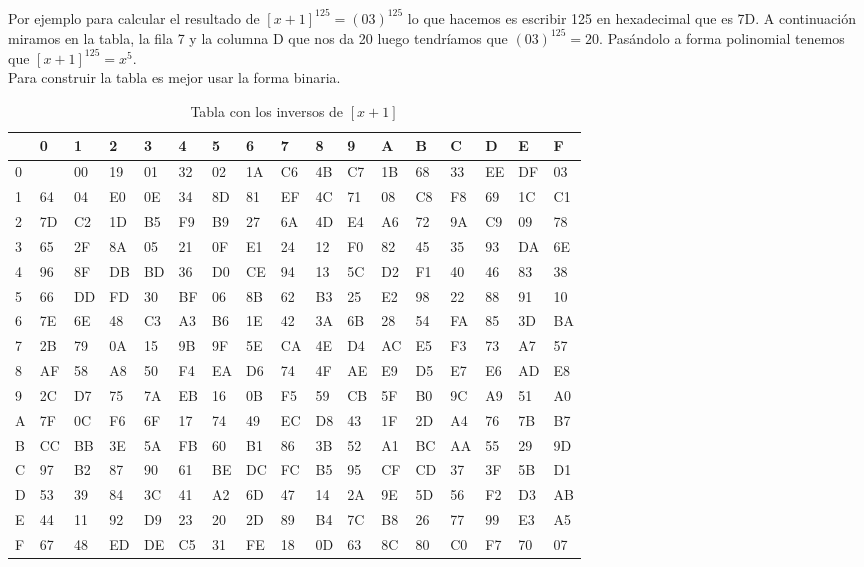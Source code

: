 Por ejemplo para calcular el resultado de $[x+1]^{125}=(03)^{125}$ lo que hacemos es escribir 125 en hexadecimal que es 7D. A continuación miramos en la tabla, la fila 7 y la columna D que nos da 20 luego tendríamos que $(03)^{125}=20$. Pasándolo a forma polinomial tenemos que $[x+1]^{125}=x^5$.\\
Para construir la tabla es mejor usar la forma binaria.

\begin{table}[!htb]
    \begin{adjustwidth}{-.8in}{-.8in}  
\begin{tabular}{|l|l|l|l|l|l|l|l|l|l|l|l|l|l|l|l|l|}
\hline
  & 0  & 1  & 2  & 3  & 4  & 5  & 6  & 7  & 8  & 9  & A  & B  & C  & D  & E  & F  \\ \hline
0 &    & 00 & 19 & 01 & 32 & 02 & 1A & C6 & 4B & C7 & 1B & 68 & 33 & EE & DF & 03 \\ \hline
1 & 64 & 04 & E0 & 0E & 34 & 8D & 81 & EF & 4C & 71 & 08 & C8 & F8 & 69 & 1C & C1 \\ \hline
2 & 7D & C2 & 1D & B5 & F9 & B9 & 27 & 6A & 4D & E4 & A6 & 72 & 9A & C9 & 09 & 78 \\ \hline
3 & 65 & 2F & 8A & 05 & 21 & 0F & E1 & 24 & 12 & F0 & 82 & 45 & 35 & 93 & DA & 6E \\ \hline
4 & 96 & 8F & DB & BD & 36 & D0 & CE & 94 & 13 & 5C & D2 & F1 & 40 & 46 & 83 & 38 \\ \hline
5 & 66 & DD & FD & 30 & BF & 06 & 8B & 62 & B3 & 25 & E2 & 98 & 22 & 88 & 91 & 10 \\ \hline
6 & 7E & 6E & 48 & C3 & A3 & B6 & 1E & 42 & 3A & 6B & 28 & 54 & FA & 85 & 3D & BA \\ \hline
7 & 2B & 79 & 0A & 15 & 9B & 9F & 5E & CA & 4E & D4 & AC & E5 & F3 & 73 & A7 & 57 \\ \hline
8 & AF & 58 & A8 & 50 & F4 & EA & D6 & 74 & 4F & AE & E9 & D5 & E7 & E6 & AD & E8 \\ \hline
9 & 2C & D7 & 75 & 7A & EB & 16 & 0B & F5 & 59 & CB & 5F & B0 & 9C & A9 & 51 & A0 \\ \hline
A & 7F & 0C & F6 & 6F & 17 & 74 & 49 & EC & D8 & 43 & 1F & 2D & A4 & 76 & 7B & B7 \\ \hline
B & CC & BB & 3E & 5A & FB & 60 & B1 & 86 & 3B & 52 & A1 & BC & AA & 55 & 29 & 9D \\ \hline
C & 97 & B2 & 87 & 90 & 61 & BE & DC & FC & B5 & 95 & CF & CD & 37 & 3F & 5B & D1 \\ \hline
D & 53 & 39 & 84 & 3C & 41 & A2 & 6D & 47 & 14 & 2A & 9E & 5D & 56 & F2 & D3 & AB \\ \hline
E & 44 & 11 & 92 & D9 & 23 & 20 & 2D & 89 & B4 & 7C & B8 & 26 & 77 & 99 & E3 & A5 \\ \hline
F & 67 & 48 & ED & DE & C5 & 31 & FE & 18 & 0D & 63 & 8C & 80 & C0 & F7 & 70 & 07 \\ \hline
\end{tabular}
	\label{potenciasinversas}
    \end{adjustwidth}
\caption{Tabla con los inversos de $[x+1]$}
\end{table}

